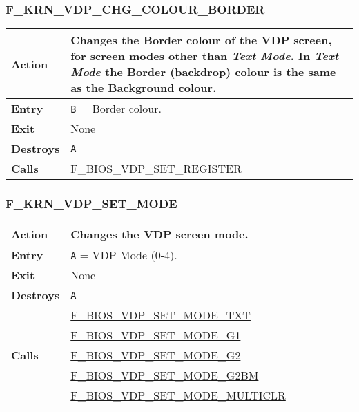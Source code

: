     \subsubsection{F\_KRN\_VDP\_CHG\_COLOUR\_BORDER}
    \label{func:fkrnvdpchgcolourborder}
    \begin{tabular}{l p{15cm}}
        \hline\textbf{Action}
        & Changes the Border colour of the \textbf{VDP} screen, for screen
        modes other than \textit{Text Mode}. In \textit{Text Mode} the
        Border (backdrop) colour is the same as the Background colour.\\
        \hline\textbf{Entry} & \texttt{B} = Border colour.\\
        \hline\textbf{Exit} & None\\
        \hline\textbf{Destroys} & \texttt{A}\\
        \hline\textbf{Calls}
        & \hyperref[func:fbiosvdpsetregister]{F\_BIOS\_VDP\_SET\_REGISTER}\\
        \hline
    \end{tabular}

    \subsubsection{F\_KRN\_VDP\_SET\_MODE}
    \label{func:fkrnvdpsetmode}
    \begin{tabular}{l p{15cm}}
        \hline\textbf{Action}
        & Changes the \textbf{VDP} screen mode.\\
        \hline\textbf{Entry} & \texttt{A} = VDP Mode (0-4).\\
        \hline\textbf{Exit} & None\\
        \hline\textbf{Destroys} & \texttt{A}\\
        \hline\multirow[t]{5}{4em}{\textbf{Calls}}
        & \hyperref[func:fbiosvdpsetmodetxt]{F\_BIOS\_VDP\_SET\_MODE\_TXT}\\
        & \hyperref[func:fbiosvdpsetmodeg1]{F\_BIOS\_VDP\_SET\_MODE\_G1}\\
        & \hyperref[func:fbiosvdpsetmodeg2]{F\_BIOS\_VDP\_SET\_MODE\_G2}\\
        & \hyperref[func:fbiosvdpsetmodeg2bm]{F\_BIOS\_VDP\_SET\_MODE\_G2BM}\\
        & \hyperref[func:fbiosvdpsetmodemulticlr]{F\_BIOS\_VDP\_SET\_MODE\_MULTICLR}\\
        \hline
    \end{tabular}